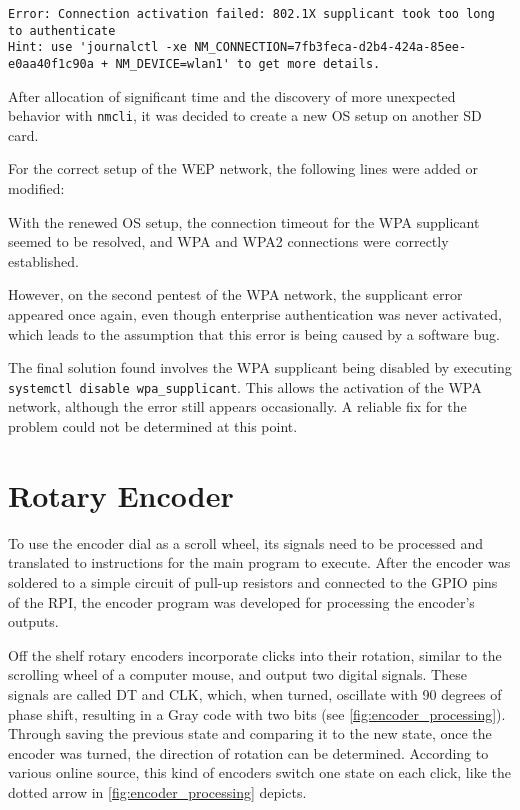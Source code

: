 \begin{lstlisting}[style=block, numbers=none]
Error: Connection activation failed: 802.1X supplicant took too long to authenticate 
Hint: use 'journalctl -xe NM_CONNECTION=7fb3feca-d2b4-424a-85ee-e0aa40f1c90a + NM_DEVICE=wlan1' to get more details.
\end{lstlisting}

After allocation of significant time and the discovery of more unexpected behavior with \lstinline[]|nmcli|, it was decided to create a new OS setup on another SD card.

For the correct setup of the WEP network, the following lines were added or modified:


With the renewed OS setup, the connection timeout for the WPA supplicant seemed to be resolved, and WPA and WPA2 connections were correctly established.

However, on the second pentest of the WPA network, the supplicant error appeared once again, even though enterprise authentication was never activated, which leads to the assumption that this error is being caused by a software bug.

The final solution found involves the WPA supplicant being disabled by executing
\\\lstinline[]|systemctl disable wpa_supplicant|.
This allows the activation of the WPA network, although the error still appears occasionally.
A reliable fix for the problem could not be determined at this point.

\section{Rotary Encoder}
To use the encoder dial as a scroll wheel, its signals need to be processed and translated to instructions for the main program to execute.
After the encoder was soldered to a simple circuit of pull-up resistors and connected to the GPIO pins of the RPI, the encoder program was developed for processing the encoder's outputs.

Off the shelf rotary encoders incorporate clicks into their rotation, similar to the scrolling wheel of a computer mouse, and output two digital signals.
These signals are called DT and CLK, which, when turned, oscillate with 90 degrees of phase shift, resulting in a Gray code with two bits (see \cref{fig:encoder_processing}).
Through saving the previous state and comparing it to the new state, once the encoder was turned, the direction of rotation can be determined.
According to various online source, this kind of encoders switch one state on each click, like the dotted arrow in \cref{fig:encoder_processing} depicts.

